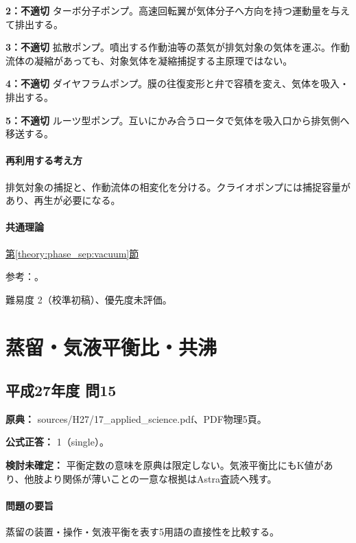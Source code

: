\noindent\textbf{2：不適切} ターボ分子ポンプ。高速回転翼が気体分子へ方向を持つ運動量を与えて排出する。\par

\noindent\textbf{3：不適切} 拡散ポンプ。噴出する作動油等の蒸気が排気対象の気体を運ぶ。作動流体の凝縮があっても、対象気体を凝縮捕捉する主原理ではない。\par

\noindent\textbf{4：不適切} ダイヤフラムポンプ。膜の往復変形と弁で容積を変え、気体を吸入・排出する。\par

\noindent\textbf{5：不適切} ルーツ型ポンプ。互いにかみ合うロータで気体を吸入口から排気側へ移送する。\par

\paragraph{再利用する考え方} 排気対象の捕捉と、作動流体の相変化を分ける。クライオポンプには捕捉容量があり、再生が必要になる。

\paragraph{共通理論} \hyperref[theory:phase_sep:vacuum]{第\ref*{theory:phase_sep:vacuum}節}

\par 参考：\cite{leybold_cryopump}。

\par 難易度 2（校準初稿）、優先度未評価。

\section{蒸留・気液平衡比・共沸}

\subsection{平成27年度 問15}
\label{q:h27-reg-applied-15}

\noindent\textbf{原典：} sources/H27/17\_applied\_science.pdf、PDF物理5頁。

\textbf{公式正答：} 1（single）。

\par\textbf{検討未確定：} 平衡定数の意味を原典は限定しない。気液平衡比にもK値があり、他肢より関係が薄いことの一意な根拠はAstra査読へ残す。

\paragraph{問題の要旨} 蒸留の装置・操作・気液平衡を表す5用語の直接性を比較する。


